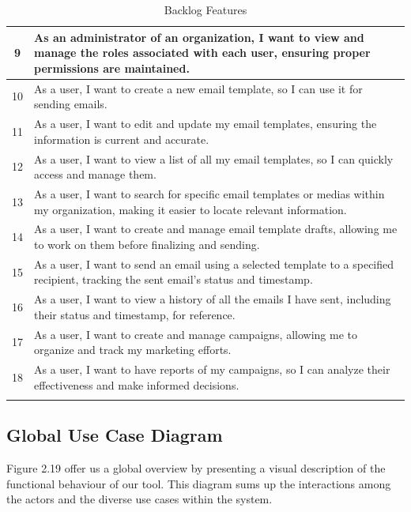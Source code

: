 \begin{longtable}{|c|p{}|}
	\hline
	9           & As an administrator of an organization, I want to view and manage the roles associated with each user, ensuring proper permissions are maintained.             \\
	\hline
	10          & As a user, I want to create a new email template, so I can use it for sending emails.                                                                          \\
	\hline
	11          & As a user, I want to edit and update my email templates, ensuring the information is current and accurate.                                                     \\
	\hline
	12          & As a user, I want to view a list of all my email templates, so I can quickly access and manage them.                                                           \\
	\hline
	13          & As a user, I want to search for specific email templates or medias within my organization, making it easier to locate relevant information.                    \\
	\hline
	14          & As a user, I want to create and manage email template drafts, allowing me to work on them before finalizing and sending.                                       \\
	\hline
	15          & As a user, I want to send an email using a selected template to a specified recipient, tracking the sent email's status and timestamp.                         \\
	\hline
	16          & As a user, I want to view a history of all the emails I have sent, including their status and timestamp, for reference.                                        \\
	\hline
	17          & As a user, I want to create and manage campaigns, allowing me to organize and track my marketing efforts.                                                      \\
	\hline
	18          & As a user, I want to have reports of my campaigns, so I can analyze their effectiveness and make informed decisions.                                           \\
	\hline
	\caption{Backlog Features}
	\label{tab:Backlog Features}
\end{longtable}


\newpage

\subsection{Global Use Case Diagram}
Figure 2.19 offer us a global overview by presenting a visual description of the functional
behaviour of our tool. This diagram sums up the interactions among the actors and the
diverse use cases within the system.

